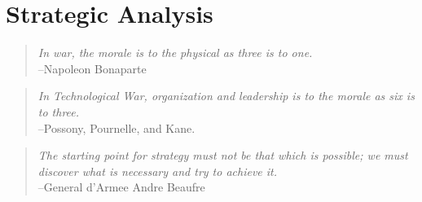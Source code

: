 \chapter{Strategic Analysis}

\begin{quotation}
    \textit{In war, the morale is to the physical as three is to one.} \\
--Napoleon Bonaparte
\end{quotation}

\medskip

\begin{quotation}
\textit{In Technological War, organization and leadership is to the morale as six is to three.} \\
--Possony, Pournelle, and Kane.
\end{quotation}

\medskip

\begin{quotation}
\textit{The starting point for strategy must not be that which is possible; we must discover what is necessary and try to achieve it.} \\
--General d'Armee Andre Beaufre
\end{quotation}

